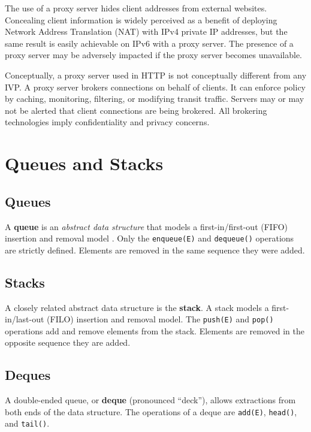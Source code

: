 \documentclass{book}
\begin{document}
The use of a proxy server hides client addresses from external websites. Concealing client information is widely perceived as a benefit of deploying Network Address Translation (NAT) with IPv4 private IP addresses, but the same result is easily achievable on IPv6 with a proxy server. The presence of a proxy server may be adversely impacted if the proxy server becomes unavailable.

Conceptually, a proxy server used in HTTP is not conceptually different from any IVP. A proxy server brokers connections on behalf of clients. It can enforce policy by caching, monitoring, filtering, or modifying transit traffic. Servers may or may not be alerted that client connections are being brokered. All brokering technologies imply confidentiality and privacy concerns.

\chapter{Queues and Stacks}

\section{Queues}

A \textbf{queue} is an \textit{abstract data structure} that models a first-in/first-out (FIFO) insertion and removal model \cite{Aho:1992:FCS:114768}. Only the \texttt{enqueue(E)} and \texttt{dequeue()} operations are strictly defined. Elements are removed in the same sequence they were added.

\section{Stacks}

A closely related abstract data structure is the \textbf{stack}. A stack models a first-in/last-out (FILO) insertion and removal model. The \texttt{push(E)} and \texttt{pop()} operations add and remove elements from the stack. Elements are removed in the opposite sequence they are added.

\section{Deques}

A double-ended queue, or \textbf{deque} (pronounced ``deck''), allows extractions from both ends of the data structure. The operations of a deque are \texttt{add(E)}, \texttt{head()}, and \texttt{tail()}.
\end{document}
